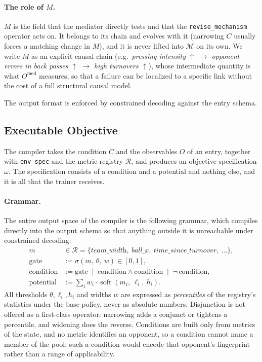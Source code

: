 \documentclass[11pt]{article}
\newcommand{\Mst}{\mathcal{M}}           %
\newcommand{\reg}{\mathcal{R}}           %
\newcommand{\code}[1]{\texttt{\small #1}}
\begin{document}
\paragraph{The role of $M$.}
$M$ is the field that the mediator directly tests and that the \code{revise\_mechanism} operator acts on.
It belongs to its chain and evolves with it (narrowing $C$ usually forces a matching change in $M$), and it is never lifted into $\Mst$ on its own.
We write $M$ as an explicit causal chain (e.g.\ \emph{pressing intensity $\uparrow$ $\to$ opponent errors in back passes $\uparrow$ $\to$ high turnovers $\uparrow$}), whose intermediate quantity is what $O^{\mathrm{med}}$ measures, so that a failure can be localized to a specific link without the cost of a full structural causal model.

The output format is enforced by constrained decoding against the entry schema.

\subsection{Executable Objective}
\label{sec:compile}

The compiler takes the condition $C$ and the observables $O$ of an entry, together with \code{env\_spec} and the metric registry $\reg$, and produces an objective specification $\omega$.
The specification consists of a condition and a potential and nothing else, and it is all that the trainer receives.

\paragraph{Grammar.}
The entire output space of the compiler is the following grammar, which compiles directly into the output schema so that anything outside it is unreachable under constrained decoding:
\begin{align}
  m &\in \reg = \{\textit{team\_width},\ \textit{ball\_x},\ \textit{time\_since\_turnover},\ \dots\}, \\
  \text{gate} &:= \sigma(m,\ \theta,\ w) \in [0,1], \\
  \text{condition} &:= \text{gate} \;\mid\; \text{condition} \wedge \text{condition} \;\mid\; \neg\,\text{condition}, \\
  \text{potential} &:= \textstyle\sum_i w_i \cdot \operatorname{soft}(m_i,\ \ell_i,\ h_i).
\end{align}
All thresholds $\theta, \ell_i, h_i$ and widths $w$ are expressed as \emph{percentiles} of the registry's statistics under the base policy, never as absolute numbers.
Disjunction is not offered as a first-class operator: narrowing adds a conjunct or tightens a percentile, and widening does the reverse.
Conditions are built only from metrics of the state, and no metric identifies an opponent, so a condition cannot name a member of the pool; such a condition would encode that opponent's fingerprint rather than a range of applicability.
\end{document}
